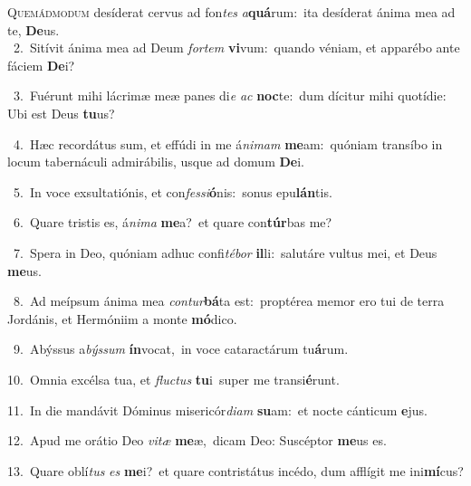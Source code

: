 \lettrine{\initial\textcolor{\initialcolor}{Q}}{uemádmodum} desíderat cervus ad fon\textit{tes} \textit{a}\-\textbf{quá}rum:~\star ita desíderat ánima mea ad te, \textbf{De}\-us.\\
{\numbfont\textcolor{\numbcolor}{~2.}}~Sitívit ánima mea ad Deum \textit{for}\-\textit{tem} \textbf{vi}\-vum:~\star quando véniam, et apparébo ante fáciem \textbf{De}\-i?\par
{\numbfont\textcolor{\numbcolor}{~3.}}~Fuérunt mihi lácrimæ meæ panes di\textit{e} \textit{ac} \textbf{noc}\-te:~\star dum dícitur mihi quotídie: Ubi est Deus \textbf{tu}\-us?\par
{\numbfont\textcolor{\numbcolor}{~4.}}~Hæc recordátus sum, et effúdi in me á\-\textit{ni}\-\textit{mam} \textbf{me}\-am:~\star quóniam transíbo in locum tabernáculi admirábilis, usque ad domum \textbf{De}\-i.\par
{\numbfont\textcolor{\numbcolor}{~5.}}~In voce exsultatiónis, et con\-\textit{fes}\-\textit{si}\textbf{ó}nis:~\star sonus epu\-\textbf{lán}\-tis.\par
{\numbfont\textcolor{\numbcolor}{~6.}}~Quare tristis es, á\-\textit{ni}\-\textit{ma} \textbf{me}\-a?~\star et quare con\-\textbf{túr}\-bas me?\par
{\numbfont\textcolor{\numbcolor}{~7.}}~Spera in Deo, quóniam adhuc confi\-\textit{té}\-\textit{bor} \textbf{il}\-li:~\star salutáre vultus mei, et Deus \textbf{me}\-us.\par
{\numbfont\textcolor{\numbcolor}{~8.}}~Ad meípsum ánima mea \textit{con}\-\textit{tur}\textbf{bá}ta est:~\star proptérea memor ero tui de terra Jordánis, et Hermóniim a monte \textbf{mó}\-dico.\par
{\numbfont\textcolor{\numbcolor}{~9.}}~Abýssus a\-\textit{býs}\-\textit{sum} \textbf{ín}\-vocat,~\star in voce cataractárum tu\-\textbf{á}\-rum.\par
{\numbfont\textcolor{\numbcolor}{10.}}~Omnia excélsa tua, et \textit{fluc}\-\textit{tus} \textbf{tu}\-i~\star super me transi\-\textbf{é}\-runt.\par
{\numbfont\textcolor{\numbcolor}{11.}}~In die mandávit Dóminus misericór\-\textit{di}\-\textit{am} \textbf{su}\-am:~\star et nocte cánticum \textbf{e}\-jus.\par
{\numbfont\textcolor{\numbcolor}{12.}}~Apud me orátio Deo \textit{vi}\-\textit{tæ} \textbf{me}\-æ,~\star dicam Deo: Suscéptor \textbf{me}\-us es.\par
{\numbfont\textcolor{\numbcolor}{13.}}~Quare oblí\textit{tus} \textit{es} \textbf{me}\-i?~\star et quare contristátus incédo, dum afflígit me ini\-\textbf{mí}\-cus?\par
